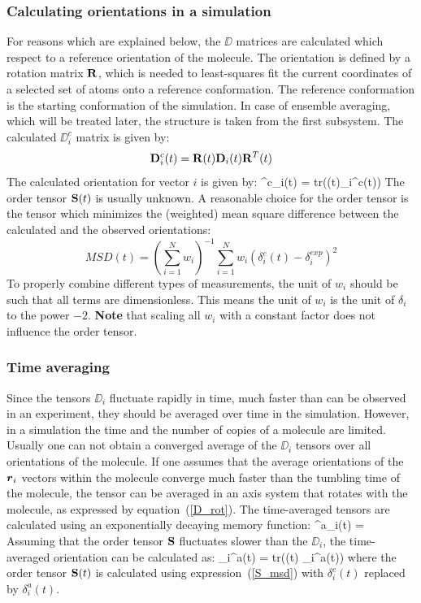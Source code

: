 
\subsubsection{Calculating orientations in a simulation}
For reasons which are explained below, the $\DD$ matrices are calculated
which respect to a reference orientation of the molecule. The orientation
is defined by a rotation matrix ${\mathbf R}$, which is needed to least-squares fit
the current coordinates of a selected set of atoms onto
a reference conformation. The reference conformation is the starting
conformation of the simulation. In case of ensemble averaging, which will
be treated later, the structure is taken from the first subsystem.
The calculated $\DD_i^c$ matrix is given by:
\begin{equation}
\label{D_rot}
{\mathbf D}_i^c(t) = {\mathbf R}(t) {\mathbf D}_i(t) {\mathbf R}^T(t)
\end{equation}
The calculated orientation for vector $i$ is given by:
\beq
\delta^c_i(t) =  \mbox{tr}(\SSS(t)\DD_i^c(t))
\eeq
The order tensor ${\mathbf S}(t)$ is usually unknown.
A reasonable choice for the order tensor is the tensor
which minimizes the (weighted) mean square difference between the calculated
and the observed orientations:
\begin{equation}
\label{S_msd}
MSD(t) = \left(\sum_{i=1}^N w_i\right)^{-1} \sum_{i=1}^N w_i (\delta_i^c (t) -\delta_i^{exp})^2
\end{equation}
To properly combine different types of measurements, the unit of $w_i$ should
be such that all terms are dimensionless. This means the unit of $w_i$
is the unit of $\delta_i$ to the power $-2$.
{\bf Note} that scaling all $w_i$ with a constant factor does not influence
the order tensor.

\subsubsection{Time averaging}
Since the tensors $\DD_i$ fluctuate rapidly in time, much faster than can
be observed in an experiment, they should be averaged over time in the simulation.
However, in a simulation the time and the number of copies of
a molecule are limited. Usually one can not obtain a converged average
of the $\DD_i$ tensors over all orientations of the molecule.
If one assumes that the average orientations of the $\mbox{\boldmath ${r}$}_i$ vectors
within the molecule converge much faster than the tumbling time of
the molecule, the tensor can be averaged in an axis system that 
rotates with the molecule, as expressed by equation~(\ref{D_rot}).
The time-averaged tensors are calculated
using an exponentially decaying memory function:
\beq
\DD^a_i(t) = 
\eeq
Assuming that the order tensor ${\mathbf S}$ fluctuates slower than the
$\DD_i$, the time-averaged orientation can be calculated as:
\beq
\delta_i^a(t) =  \mbox{tr}(\SSS(t) \DD_i^a(t))
\eeq
where the order tensor ${\mathbf S}(t)$ is calculated using expression~(\ref{S_msd})
with $\delta_i^c(t)$ replaced by $\delta_i^a(t)$.

